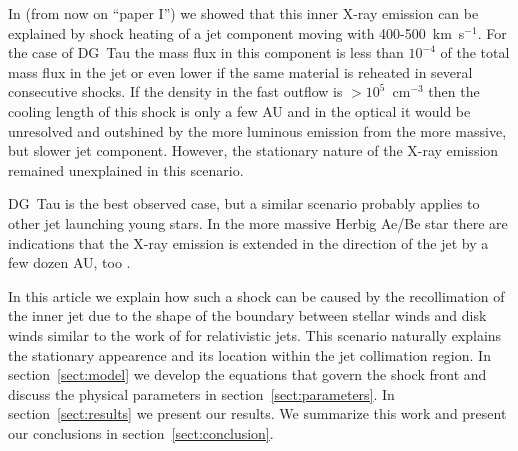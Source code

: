 In \citet{2009A&A...493..579G} (from now on ``paper I'') we showed that this inner X-ray emission can be explained by shock heating of a jet component moving with 400-500~km~s$^{-1}$. For the case of DG~Tau the mass flux in this component is less than $10^{-4}$ of the total mass flux in the jet or even lower if the same material is reheated in several consecutive shocks. If the density in the fast outflow is $>10^5$~cm$^{-3}$ then the cooling length of this shock is only a few AU and in the optical it would be unresolved and outshined by the more luminous emission from the more massive, but slower jet component. However, the stationary nature of the X-ray emission remained unexplained in this scenario.

DG~Tau is the best observed case, but a similar scenario probably applies to other jet launching young stars. In the more massive Herbig Ae/Be star  there are indications that the X-ray emission is extended in the direction of the jet by a few dozen AU, too \citep{2005ApJ...628..811S,2013A&A...552A.142G}.

In this article we explain how such a shock can be caused by the recollimation of the inner jet due to the shape of the boundary between stellar winds and disk winds similar to the work of \citet{2012MNRAS.422.2282K} for relativistic jets. This scenario naturally explains the stationary appearence and its location within the jet collimation region. In section~\ref{sect:model} we develop the equations that govern the shock front and discuss the physical parameters in section~\ref{sect:parameters}. In section~\ref{sect:results} we present our results. We summarize this work and present our conclusions in section~\ref{sect:conclusion}.
